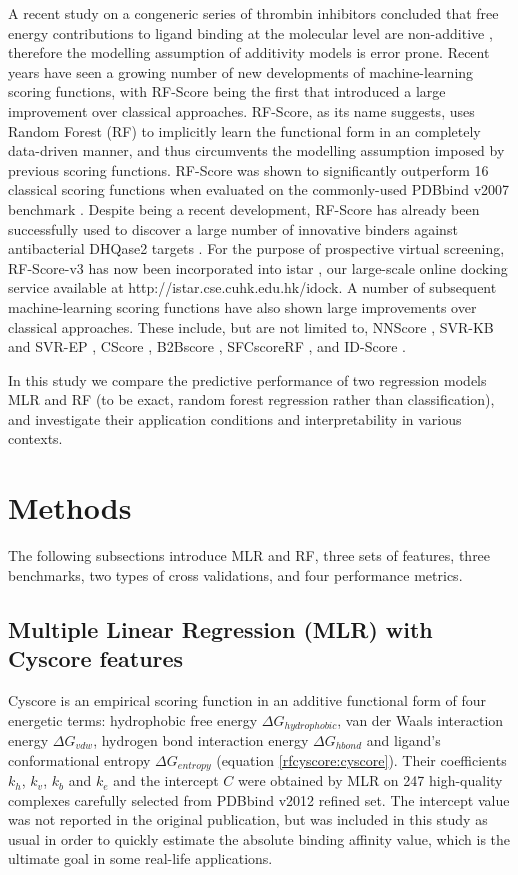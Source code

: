 A recent study on a congeneric series of thrombin inhibitors concluded that free energy contributions to ligand binding at the molecular level are non-additive \citep{1416}, therefore the modelling assumption of additivity models is error prone. Recent years have seen a growing number of new developments of machine-learning scoring functions, with RF-Score \citep{564} being the first that introduced a large improvement over classical approaches. RF-Score, as its name suggests, uses Random Forest (RF) \citep{1309} to implicitly learn the functional form in an completely data-driven manner, and thus circumvents the modelling assumption imposed by previous scoring functions. RF-Score was shown to significantly outperform 16 classical scoring functions when evaluated on the commonly-used PDBbind v2007 benchmark \citep{564}. Despite being a recent development, RF-Score has already been successfully used to discover a large number of innovative binders against antibacterial DHQase2 targets \citep{1281}. For the purpose of prospective virtual screening, RF-Score-v3 has now been incorporated into istar \citep{1362}, our large-scale online docking service available at http://istar.cse.cuhk.edu.hk/idock. A number of subsequent machine-learning scoring functions have also shown large improvements over classical approaches. These include, but are not limited to, NNScore \citep{977}, SVR-KB and SVR-EP \citep{963}, CScore \citep{1194}, B2Bscore \citep{1410}, SFCscoreRF \citep{1347}, and ID-Score \citep{1305}.

In this study we compare the predictive performance of two regression models MLR and RF (to be exact, random forest regression rather than classification), and investigate their application conditions and interpretability in various contexts.

\section{Methods}

The following subsections introduce MLR and RF, three sets of features, three benchmarks, two types of cross validations, and four performance metrics.

\subsection{Multiple Linear Regression (MLR) with Cyscore features}

Cyscore is an empirical scoring function in an additive functional form of four energetic terms: hydrophobic free energy $\Delta G_{hydrophobic}$, van der Waals interaction energy $\Delta G_{vdw}$, hydrogen bond interaction energy $\Delta G_{hbond}$ and ligand's conformational entropy $\Delta G_{entropy}$ (equation \eqref{rfcyscore:cyscore}). Their coefficients $k_h$, $k_v$, $k_b$ and $k_e$ and the intercept $C$ were obtained by MLR on 247 high-quality complexes carefully selected from PDBbind v2012 refined set. The intercept value was not reported in the original publication, but was included in this study as usual \citep{1313} in order to quickly estimate the absolute binding affinity value, which is the ultimate goal in some real-life applications.

